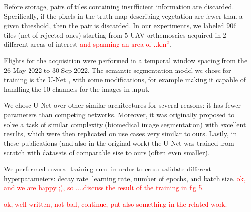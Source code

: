 \documentclass[comsoc,final]{IEEEtran}
\newcommand{\todo}[1]{\textcolor{red}{#1}}
\begin{document}
Before storage, pairs of tiles containing insufficient information are discarded. Specifically, if the pixels in the truth map describing vegetation are fewer than a given threshold, then the pair is discarded. In our experiments, we labeled $906$ tiles (net of rejected ones) starting from $5$ UAV orthomosaics acquired in $2$ different areas of interest \todo{and spanning an area of ..km$^2$}.

Flights for the acquisition were performed in a temporal window spacing from the $26$ May $2022$ to $30$ Sep $2022$. The semantic segmentation model we chose for training is the U-Net 
\cite{ronneberger_u-net_2015}, with some modifications, 
for example making it capable of handling the 10 channels for the images in input. 


We chose U-Net over other similar architectures for several reasons: it has fewer parameters than competing networks. Moreover, it was originally proposed to solve a task of similar complexity (biomedical image segmentation) with excellent results, which were then replicated on use cases very similar to ours. Lastly, in these publications (and also in the original work) the U-Net was trained from scratch with datasets of comparable size to ours (often even smaller).

We performed several training runs in order to cross validate different hyperparameters: decay rate, learning rate, number of epochs, and batch size. \todo{ok, and we are happy ;), so ....discuss the result of the training in fig 5.}

\todo{ok, well written, not bad, continue, put also something in the related work.}
\end{document}
